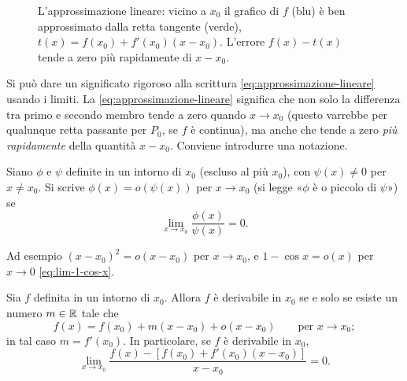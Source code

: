 \begin{figure}[htb]
\centering
{}
\caption{L'approssimazione lineare: vicino a $x_{0}$ il grafico di $f$ (blu) è ben
approssimato dalla retta tangente (verde), $t(x)=f(x_{0})+f'(x_{0})(x-x_{0})$. L'errore
$f(x)-t(x)$ tende a zero più rapidamente di $x-x_{0}$.}
\label{fig:approssimazione-lineare}
\end{figure}

Si può dare un significato rigoroso alla scrittura \eqref{eq:approssimazione-lineare}
usando i limiti. La \eqref{eq:approssimazione-lineare} significa che non solo la
differenza tra primo e secondo membro tende a zero quando $x\to x_{0}$ (questo varrebbe
per qualunque retta passante per $P_{0}$, se $f$ è continua), ma anche che tende a zero
\emph{più rapidamente} della quantità $x-x_{0}$. Conviene introdurre una notazione.

\begin{definizione}\label{def:o-piccolo}
Siano $\phi$ e $\psi$ definite in un intorno di $x_{0}$ (escluso al più $x_{0}$), con
$\psi(x)\neq0$ per $x\neq x_{0}$. Si scrive $\phi(x)=o(\psi(x))$ per $x\to x_{0}$ (si
legge «$\phi$ è o piccolo di $\psi$») se
\[
  \lim_{x\to x_{0}}\frac{\phi(x)}{\psi(x)}=0 .
\]
\end{definizione}

Ad esempio $(x-x_{0})^{2}=o(x-x_{0})$ per $x\to x_{0}$, e $1-\cos x=o(x)$ per $x\to0$
\eqref{eq:lim-1-cos-x}.

\begin{proposizione}\label{prop:approssimazione-lineare}
Sia $f$ definita in un intorno di $x_{0}$. Allora $f$ è derivabile in $x_{0}$ se e solo
se esiste un numero $m\in\mathbb{R}$ tale che
\begin{equation}\label{eq:sviluppo-primo-ordine}
  f(x)=f(x_{0})+m(x-x_{0})+o(x-x_{0}) \qquad\text{per } x\to x_{0};
\end{equation}
in tal caso $m=f'(x_{0})$. In particolare, se $f$ è derivabile in $x_{0}$,
\begin{equation}\label{eq:errore-tangente}
  \lim_{x\to x_{0}}\frac{f(x)-[f(x_{0})+f'(x_{0})(x-x_{0})]}{x-x_{0}}=0 .
\end{equation}
\end{proposizione}

